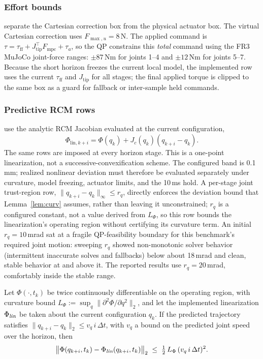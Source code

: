 \subsubsection{Effort bounds} separate the Cartesian correction box from the physical actuator box. The virtual Cartesian correction uses $F_{\max,u}=8$\,N. The applied command is
$\tau=\tau_{\text{ff}}+J_{\text{tip}}^\top F_{\text{mpc}}+\tau_a$, so the QP constrains this \emph{total} command using the FR3 MuJoCo joint-force ranges: $\pm87$\,Nm for joints 1--4 and $\pm12$\,Nm for joints 5--7. Because the short horizon freezes the current local model, the implemented row uses the current $\tau_{\text{ff}}$ and $J_{\text{tip}}$ for all stages; the final applied torque is clipped to the same box as a guard for fallback or inter-sample held commands.

\subsubsection{Predictive RCM rows} use the analytic RCM Jacobian evaluated at the current configuration,
\begin{equation}
\Phi_{\text{lin},k+i}=\Phi(q_k)+J_c(q_k)(q_{k+i}-q_k).
\end{equation}
The same rows are imposed at every horizon stage. This is a one-point linearization, not a successive-convexification scheme. The configured band is 0.1\,mm; realized nonlinear deviation must therefore be evaluated separately under curvature, model freezing, actuator limits, and the 10\,ms hold. A per-stage joint trust-region row, $\|q_{k+i}-q_k\|_\infty\le r_q$, directly enforces the deviation bound that Lemma~\ref{lem:curv} assumes, rather than leaving it unconstrained; $r_q$ is a configured constant, not a value derived from $L_\Phi$, so this row bounds the linearization's operating region without certifying its curvature term. An initial $r_q=10$\,mrad sat at a fragile QP-feasibility boundary for this benchmark's required joint motion: sweeping $r_q$ showed non-monotonic solver behavior (intermittent inaccurate solves and fallbacks) below about 18\,mrad and clean, stable behavior at and above it. The reported results use $r_q=20$\,mrad, comfortably inside the stable range.

\begin{lemma}\label{lem:curv}
Let $\Phi(\cdot,t_k)$ be twice continuously differentiable on the operating region, with curvature bound $L_\Phi := \sup_q \|\partial^2\Phi/\partial q^2\|_2$, and let the implemented linearization $\Phi_{\emph{lin}}$ be taken about the current configuration $q_k$. If the predicted trajectory satisfies $\|q_{k+i}-q_k\|_2 \le v_q\, i\,\Delta t$, with $v_q$ a bound on the predicted joint speed over the horizon, then
\begin{equation}
\big\|\Phi(q_{k+i},t_k)-\Phi_{\emph{lin}}(q_{k+i},t_k)\big\|_2 \;\le\; \tfrac12\, L_\Phi\,(v_q\, i\,\Delta t)^2 .
\label{eq:curv}
\end{equation}
\end{lemma}

